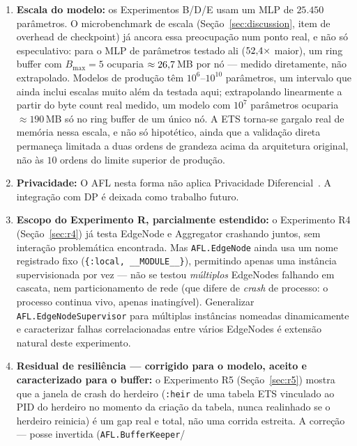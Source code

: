 \documentclass[conference,a4paper]{IEEEtran}
\begin{document}
\begin{enumerate}[noitemsep,leftmargin=*]
  \item \textbf{Escala do modelo:} os Experimentos B/D/E usam um MLP de
    $25{.}450$ parâmetros. O microbenchmark de escala (Seção~\ref{sec:discussion},
    item de overhead de checkpoint) já ancora essa preocupação num ponto
    real, e não só especulativo: para o MLP de \statScaleLargeParams{}
    parâmetros testado ali ($52{,}4\times$ maior), um ring buffer com
    $B_{\max}=5$ ocuparia $\approx26{,}7$\,MB por nó ---
    medido diretamente, não extrapolado. Modelos de produção têm
    $10^6$--$10^{10}$ parâmetros, um intervalo que ainda inclui escalas
    muito além da testada aqui; extrapolando linearmente a partir do byte
    count real medido, um modelo com $10^7$ parâmetros ocuparia
    $\approx 190$\,MB só no ring buffer de um único nó. A ETS torna-se
    gargalo real de memória nessa escala, e não só hipotético, ainda que
    a validação direta permaneça limitada a duas ordens de grandeza acima
    da arquitetura original, não às $10$ ordens do limite superior de
    produção.
  \item \textbf{Privacidade:} O AFL nesta forma não aplica Privacidade
    Diferencial~\cite{dwork2014}. A integração com DP é deixada como
    trabalho futuro.
  \item \textbf{Escopo do Experimento R, parcialmente estendido:} o
    Experimento R4 (Seção~\ref{sec:r4}) já testa EdgeNode e Aggregator
    crashando juntos, sem interação problemática encontrada. Mas
    \texttt{AFL.EdgeNode} ainda usa um nome registrado fixo
    (\texttt{\{:local, \_\_MODULE\_\_\}}), permitindo apenas uma instância
    supervisionada por vez --- não se testou \emph{múltiplos} EdgeNodes
    falhando em cascata, nem particionamento de rede (que difere de
    \textit{crash} de processo: o processo continua vivo, apenas
    inatingível). Generalizar \texttt{AFL.EdgeNodeSupervisor} para múltiplas
    instâncias nomeadas dinamicamente e caracterizar falhas correlacionadas
    entre vários EdgeNodes é extensão natural deste experimento.
  \item \textbf{Residual de resiliência --- corrigido para o modelo,
    aceito e caracterizado para o buffer:} o Experimento R5
    (Seção~\ref{sec:r5}) mostra que a janela de crash do herdeiro
    (\texttt{:heir} de uma tabela ETS vinculado ao PID do herdeiro no
    momento da criação da tabela, nunca realinhado se o herdeiro
    reinicia) é um gap real e total, não uma corrida estreita. A
    correção --- posse invertida (\texttt{AFL.BufferKeeper}/

\end{enumerate}
\end{document}
